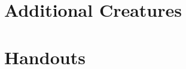 \renewcommand{\headingtype}{APPENDIX}

\chapter{Additional Creatures}

\begin{multicols}{2}




\end{multicols}

\chapter{Handouts}


